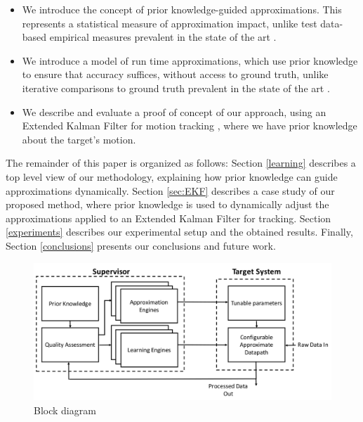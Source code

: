 \begin{itemize}
\item	We introduce the concept of prior knowledge-guided approximations. This represents a statistical measure of approximation impact, unlike test data-based empirical measures prevalent in the state of the art \cite{zhang2014approxit}.
\item	We introduce a model of run time approximations, which use prior knowledge to ensure that accuracy suffices, without access to ground truth, unlike iterative comparisons to ground truth prevalent in the state of the art \cite{mittal2016survey}.
\item 	We describe and evaluate a proof of concept of our approach, using an Extended Kalman Filter for motion tracking \cite{kulikov2016accurate}, where we have prior knowledge about the target's motion. 
\end{itemize}

\par The remainder of this paper is organized as follows: Section \ref{learning} describes a top level view of our methodology, explaining how prior knowledge can guide approximations dynamically. Section \ref{sec:EKF} describes a case study of our proposed method, where prior knowledge is used to dynamically adjust the approximations applied to an Extended Kalman Filter for tracking. Section \ref{experiments} describes our experimental setup and the obtained results. Finally, Section \ref{conclusions} presents our conclusions and future work. 


\begin{figure}[tb]
  \centering
  \includegraphics[width=\columnwidth]{img/block_diagram.png}
  \caption{Block diagram}
  \label{fig:block_diagram}
\end{figure}
